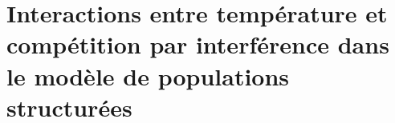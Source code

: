 \documentclass[12pt,a4paper,twoside,openright,final]{memoir}
\newif\iflofimage
\begin{document}



\chapter{Interactions entre température et compétition par interférence dans le
modèle de populations structurées}

%

%

\backmatter

\begin{Spacing}{1}
\printbibliography[title={Bibliographie}]

\newpage 
\listoftables
\newpage 
\lofimagetrue
\listoffigures
\lofimagefalse

\end{Spacing}
\end{document}
